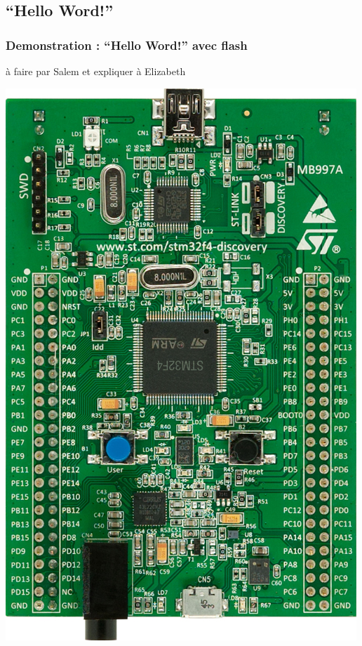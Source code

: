 \documentclass{beamer}
\begin{document}
\subsection{``Hello Word!''}
\begin{frame}
\frametitle{Demonstration : ``Hello Word!'' avec flash}
à faire par Salem et expliquer à Elizabeth
\begin{center}
 \includegraphics[scale=0.1]{../images/stm32f4_discovery.jpg}
\end{center}
\end{frame}
\end{document}
